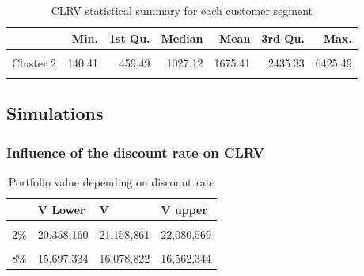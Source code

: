 \documentclass[
]{book}
\begin{document}
\begin{table}[H]

\caption{\label{tab:custValuesclust}CLRV statistical summary for each customer segment}
\centering
\begin{tabular}[t]{lrrrrrr}
\toprule
  & Min. & 1st Qu. & Median & Mean & 3rd Qu. & Max.\\
\midrule
\cellcolor{gray!6}{Cluster 1} & \cellcolor{gray!6}{141.10} & \cellcolor{gray!6}{653.93} & \cellcolor{gray!6}{930.95} & \cellcolor{gray!6}{969.20} & \cellcolor{gray!6}{1138.39} & \cellcolor{gray!6}{4727.19}\\
Cluster 2 & 140.41 & 459.49 & 1027.12 & 1675.41 & 2435.33 & 6425.49\\
\cellcolor{gray!6}{Cluster 3} & \cellcolor{gray!6}{384.60} & \cellcolor{gray!6}{2876.69} & \cellcolor{gray!6}{4312.25} & \cellcolor{gray!6}{4165.81} & \cellcolor{gray!6}{5576.70} & \cellcolor{gray!6}{6825.71}\\
\bottomrule
\end{tabular}
\end{table}

\hypertarget{simulations}{%
\subsection{Simulations}\label{simulations}}

\hypertarget{influence-of-the-discount-rate-on-clrv}{%
\subsubsection{Influence of the discount rate on CLRV}\label{influence-of-the-discount-rate-on-clrv}}

\begin{table}[H]

\caption{\label{tab:portValDiscountTab}Portfolio value depending on discount rate}
\centering
\begin{tabular}[t]{llll}
\toprule
  & V Lower & V & V upper\\
\midrule
\cellcolor{gray!6}{1\%} & \cellcolor{gray!6}{20,894,006} & \cellcolor{gray!6}{21,721,297} & \cellcolor{gray!6}{22,674,662}\\
2\% & 20,358,160 & 21,158,861 & 22,080,569\\
\cellcolor{gray!6}{4\%} & \cellcolor{gray!6}{19,357,495} & \cellcolor{gray!6}{20,108,832} & \cellcolor{gray!6}{20,971,852}\\
8\% & 15,697,334 & 16,078,822 & 16,562,344\\
\bottomrule
\end{tabular}
\end{table}
\end{document}
